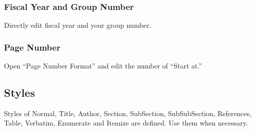 \documentclass[a4paper,twoside,twocolumn,10pt]{article}
\begin{document}
\subsubsection{Fiscal Year and Group Number}
Directly edit fiscal year and your group number.

\subsubsection{Page Number}
Open ``Page Number Format'' and edit the number of ``Start at.''

\subsection{Styles}
Styles of Normal, Title, Author, Section, SubSection, SubSubSection, References, Table, Verbatim, Enumerate and Itemize are defined.
Use them when necessary.




\end{document}
